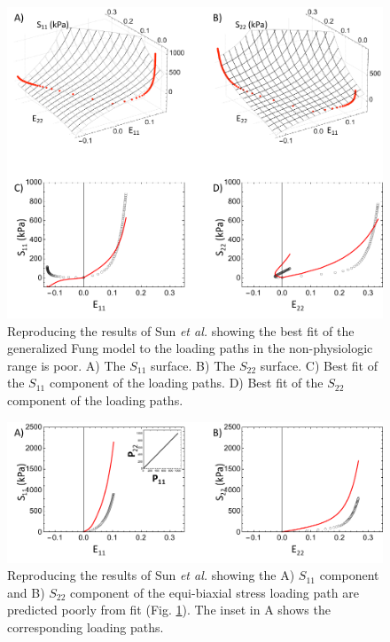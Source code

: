 \begin{figure}[hptb]
\centering
\includegraphics[width=6.5in]{Figures/fungoutfit}
\caption{Reproducing the results of Sun \textit{et al.} \cite{sun_biaxial_2003} showing the best fit of the generalized Fung model to the loading paths in the non-physiologic range is poor. A) The $S_{11}$ surface. B) The $S_{22}$ surface. C) Best fit of the $S_{11}$ component of the loading paths. D) Best fit of the $S_{22}$ component of the loading paths.}
\label{fig:fungoutfit}
\end{figure} 

\begin{figure}[hptb]
\centering
\includegraphics[width=6.5in]{Figures/fungoutpred}
\caption{Reproducing the results of Sun \textit{et al.} \cite{sun_biaxial_2003} showing the A) $S_{11}$ component and B) $S_{22}$ component of the equi-biaxial stress loading path are predicted poorly from fit (Fig. \ref{fig:fungoutfit}). The inset in A shows the corresponding loading paths.}
\label{fig:fungoutpred}
\end{figure} 
    

